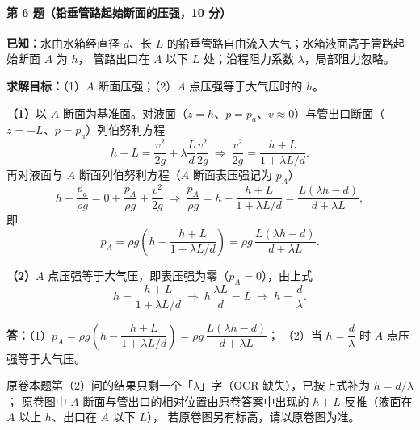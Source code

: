 \paragraph{第 6 题（铅垂管路起始断面的压强，10 分）}
\begin{jie}
\textbf{已知：}水由水箱经直径 $d$、长 $L$ 的铅垂管路自由流入大气；水箱液面高于管路起始断面 $A$ 为 $h$，
管路出口在 $A$ 以下 $L$ 处；沿程阻力系数 $\lambda$，局部阻力忽略。

\textbf{求解目标：}（1）$A$ 断面压强；（2）$A$ 点压强等于大气压时的 $h$。

\textbf{（1）}以 $A$ 断面为基准面。对液面（$z=h$、$p=p_a$、$v\approx0$）与管出口断面（$z=-L$、$p=p_a$）列伯努利方程
\[
h+L=\frac{v^{2}}{2g}+\lambda\frac Ld\frac{v^{2}}{2g}
\ \Longrightarrow\
\frac{v^{2}}{2g}=\frac{h+L}{1+\lambda L/d}.
\]
再对液面与 $A$ 断面列伯努利方程（$A$ 断面表压强记为 $p_A$）
\[
h+\frac{p_a}{\rho g}=0+\frac{p_A}{\rho g}+\frac{v^{2}}{2g}
\ \Longrightarrow\
\frac{p_A}{\rho g}=h-\frac{h+L}{1+\lambda L/d}
=\frac{L(\lambda h-d)}{d+\lambda L},
\]
即
\[
p_A=\rho g\left(h-\frac{h+L}{1+\lambda L/d}\right)=\rho g\,\frac{L(\lambda h-d)}{d+\lambda L}.
\]

\textbf{（2）}$A$ 点压强等于大气压，即表压强为零（$p_A=0$），由上式
\[
h=\frac{h+L}{1+\lambda L/d}
\ \Longrightarrow\
h\,\frac{\lambda L}{d}=L
\ \Longrightarrow\
h=\frac d\lambda .
\]

\textbf{答：}（1）$p_A=\rho g\left(h-\dfrac{h+L}{1+\lambda L/d}\right)=\rho g\,\dfrac{L(\lambda h-d)}{d+\lambda L}$；
（2）当 $h=\dfrac d\lambda$ 时 $A$ 点压强等于大气压。
\end{jie}

\begin{tishi}
原卷本题第（2）问的结果只剩一个「$\lambda$」字（OCR 缺失），已按上式补为 $h=d/\lambda$；
原卷图中 $A$ 断面与管出口的相对位置由原卷答案中出现的 $h+L$ 反推（液面在 $A$ 以上 $h$、出口在 $A$ 以下 $L$），
若原卷图另有标高，请以原卷图为准。
\end{tishi}


